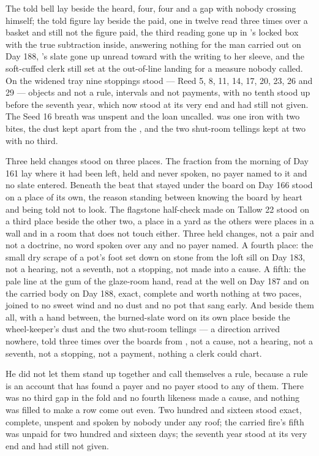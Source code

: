 The told bell lay beside the heard, four, four and a gap with nobody crossing himself; the told figure lay beside the paid, one in twelve read three times over a basket and still not the figure paid, the third reading gone up  in 's locked box with the true subtraction inside, answering nothing for the man carried out on Day 188, 's slate gone up unread toward  with the writing to her sleeve, and the soft-cuffed clerk still set at the out-of-line landing for a measure nobody called. On the widened tray nine stoppings stood --- Reed 5, 8, 11, 14, 17, 20, 23, 26 and 29 --- objects and not a rule, intervals and not payments, with no tenth stood up before the seventh year, which now stood at its very end and had still not given. The Seed 16 breath was unspent and the loan uncalled.  was one iron with two bites, the dust kept apart from the , and the two shut-room tellings kept at two with no third.

Three held changes stood on three places. The fraction from the morning of Day 161 lay where it had been left, held and never spoken, no payer named to it and no slate entered. Beneath  the beat that stayed under the board on Day 166 stood on a place of its own, the reason standing between knowing the board by heart and being told not to look. The flagstone half-check made on Tallow 22 stood on a third place beside the other two, a place in a yard as the others were places in a wall and in a room that does not touch either. Three held changes, not a pair and not a doctrine, no word spoken over any and no payer named. A fourth place: the small dry scrape of a pot's foot set down on stone from the loft sill on Day 183, not a hearing, not a seventh, not a stopping, not made into a cause. A fifth: the pale line at the gum of the glaze-room hand, read at the well on Day 187 and on the carried body on Day 188, exact, complete and worth nothing at two paces, joined to no sweet wind and no dust and no pot that sang early. And beside them all, with a hand between, the burned-slate word on its own place beside the wheel-keeper's dust and the two shut-room tellings --- a direction arrived nowhere, told three times over the boards from , not a cause, not a hearing, not a seventh, not a stopping, not a payment, nothing a clerk could chart.

He did not let them stand up together and call themselves a rule, because a rule is an account that has found a payer and no payer stood to any of them. There was no third gap in the fold and no fourth likeness made a cause, and nothing was filled to make a row come out even. Two hundred and sixteen stood exact, complete, unspent and spoken by nobody under any roof; the carried fire's fifth was unpaid for two hundred and sixteen days; the seventh year stood at its very end and had still not given.

